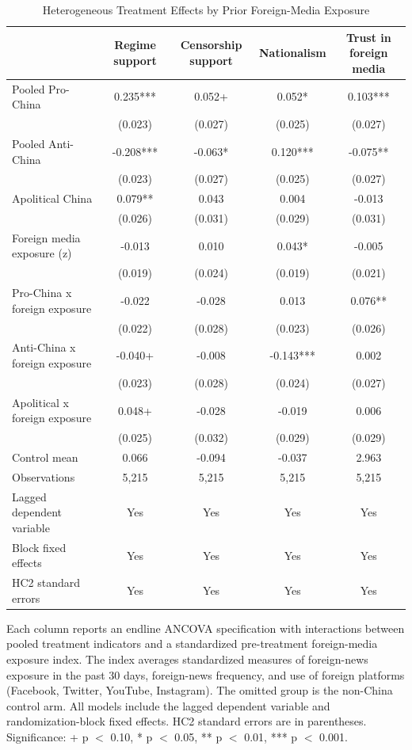 \begin{table}[H]
\centering
\caption{Heterogeneous Treatment Effects by Prior Foreign-Media Exposure}
\label{tab:het_foreign_t1}
\footnotesize
\begin{threeparttable}
\begin{tabular}{lcccc}
\toprule
 & Regime support & Censorship support & Nationalism & Trust in foreign media \\
\midrule
Pooled Pro-China & 0.235*** & 0.052+ & 0.052* & 0.103*** \\
 & (0.023) & (0.027) & (0.025) & (0.027) \\
\addlinespace
Pooled Anti-China & -0.208*** & -0.063* & 0.120*** & -0.075** \\
 & (0.023) & (0.027) & (0.025) & (0.027) \\
\addlinespace
Apolitical China & 0.079** & 0.043 & 0.004 & -0.013 \\
 & (0.026) & (0.031) & (0.029) & (0.031) \\
\addlinespace
Foreign media exposure (z) & -0.013 & 0.010 & 0.043* & -0.005 \\
 & (0.019) & (0.024) & (0.019) & (0.021) \\
\addlinespace
Pro-China x foreign exposure & -0.022 & -0.028 & 0.013 & 0.076** \\
 & (0.022) & (0.028) & (0.023) & (0.026) \\
\addlinespace
Anti-China x foreign exposure & -0.040+ & -0.008 & -0.143*** & 0.002 \\
 & (0.023) & (0.028) & (0.024) & (0.027) \\
\addlinespace
Apolitical x foreign exposure & 0.048+ & -0.028 & -0.019 & 0.006 \\
 & (0.025) & (0.032) & (0.029) & (0.029) \\
\addlinespace
\midrule
Control mean & 0.066 & -0.094 & -0.037 & 2.963 \\
Observations & 5,215 & 5,215 & 5,215 & 5,215 \\
Lagged dependent variable & Yes & Yes & Yes & Yes \\
Block fixed effects & Yes & Yes & Yes & Yes \\
HC2 standard errors & Yes & Yes & Yes & Yes \\
\bottomrule
\end{tabular}
\begin{tablenotes}[flushleft]
\footnotesize
\item Each column reports an endline ANCOVA specification with interactions between pooled treatment indicators and a standardized pre-treatment foreign-media exposure index. The index averages standardized measures of foreign-news exposure in the past 30 days, foreign-news frequency, and use of foreign platforms (Facebook, Twitter, YouTube, Instagram). The omitted group is the non-China control arm. All models include the lagged dependent variable and randomization-block fixed effects. HC2 standard errors are in parentheses. Significance: + p $<$ 0.10, * p $<$ 0.05, ** p $<$ 0.01, *** p $<$ 0.001.
\end{tablenotes}
\end{threeparttable}
\end{table}
